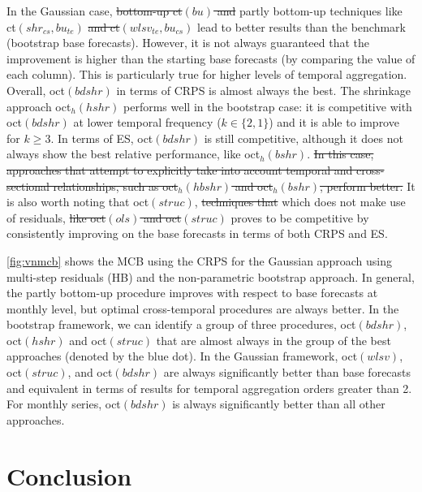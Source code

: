 \documentclass[review, 11pt]{elsarticle}
\theoremstyle{definition}
\begin{document}
In the Gaussian case, {\color{red}\sout{bottom-up ct$(bu)$ and}} partly bottom-up techniques like ct$(shr_{cs}, bu_{te})$ {\color{red}\sout{and ct$(wlsv_{te}, bu_{cs})$}} lead to better results than the benchmark (bootstrap base forecasts). However, it is not always guaranteed that the improvement is higher than the starting base forecasts (by comparing the value of each column). This is particularly true for higher levels of temporal aggregation. Overall, oct$(bdshr)$ in terms of CRPS is almost always the best. The shrinkage approach oct$_h(hshr)$ performs well in the bootstrap case: it is competitive with oct$(bdshr)$ at lower temporal frequency ($k \in \{2,1\}$) and it is able to improve for $k\ge 3$. In terms of ES, oct$(bdshr)$ is still competitive, although it does not always show the best relative performance{\color{blue}, like oct$_h(bshr)$}. {\color{red}\sout{In this case, approaches that attempt to explicitly take into account temporal and cross-sectional relationships, such as oct$_h(hbshr)$ and oct$_h(bshr)$, perform better.}} %
It is also worth noting that {\color{blue}oct$(struc)$,} {\color{red}\sout{techniques that}} {\color{blue}which} does not make use of residuals, {\color{red}\sout{like oct$(ols)$ and oct$(struc)$}} proves to be competitive by consistently improving on the base forecasts in terms of both CRPS and ES.


\autoref{fig:vnmcb} shows the MCB using the CRPS for the Gaussian approach using multi-step residuals (HB) and the non-parametric bootstrap approach. In general, the partly bottom-up procedure improves with respect to base forecasts at monthly level, but optimal cross-temporal procedures are always better. In the bootstrap framework, we can identify a group of three procedures, oct$(bdshr)$, oct$(hshr)$ and oct$(struc)$ that are almost always in the group of the best approaches (denoted by the blue dot). In the Gaussian framework, oct$(wlsv)$, oct$(struc)$, and oct$(bdshr)$ are always significantly better than base forecasts and equivalent in terms of results for temporal aggregation orders greater than 2. For monthly series, oct$(bdshr)$ is always significantly better than all other approaches.

\section{Conclusion}\label{sec:conclusion}
\end{document}
